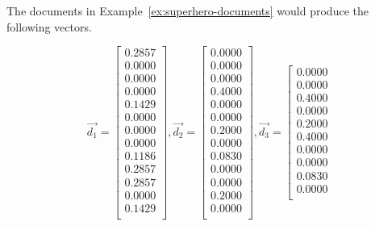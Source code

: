 		\begin{ex}
			The documents in Example~\ref{ex:superhero-documents} would produce the following vectors.
			
			$$
			\vec{d_1} = 
				\left[
					\begin{array}{c}
						0.2857 \\
						0.0000 \\
						0.0000 \\
						0.0000 \\
						0.1429 \\
						0.0000 \\
						0.0000 \\
						0.0000 \\
						0.1186 \\
						0.2857 \\
						0.2857 \\
						0.0000 \\
						0.1429 \\
					\end{array}
				\right],
			\vec{d_2} = 
				\left[
					\begin{array}{c}
						0.0000 \\
						0.0000 \\
						0.0000 \\
						0.4000 \\
						0.0000 \\
						0.0000 \\
						0.2000 \\
						0.0000 \\
						0.0830 \\
						0.0000 \\
						0.0000 \\
						0.2000 \\
						0.0000 \\
					\end{array}
				\right],
			\vec{d_3} = 
				\left[
					\begin{array}{c}
						0.0000 \\
						0.0000 \\
						0.4000 \\
						0.0000 \\
						0.2000 \\
						0.4000 \\
						0.0000 \\
						0.0000 \\
						0.0830 \\
						0.0000 \\

\end{array}$$
\end{ex}
